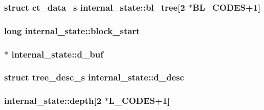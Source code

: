 \subsubsection[{bl\+\_\+tree}]{\setlength{\rightskip}{0pt plus 5cm}struct {\bf ct\+\_\+data\+\_\+s} internal\+\_\+state\+::bl\+\_\+tree\mbox{[}2 $\ast${\bf B\+L\+\_\+\+C\+O\+D\+E\+S}+1\mbox{]}}\label{structinternal__state_a98131fc5b64d0d7542bc3621aef19854}
\hypertarget{structinternal__state_a4ba16849758dfa969066693ca2cae880}{}
\subsubsection[{block\+\_\+start}]{\setlength{\rightskip}{0pt plus 5cm}long internal\+\_\+state\+::block\+\_\+start}\label{structinternal__state_a4ba16849758dfa969066693ca2cae880}
\hypertarget{structinternal__state_ac636c34c1c08dc9d2f9c199ce2caa99d}{}
\subsubsection[{d\+\_\+buf}]{$\ast$ internal\+\_\+state\+::d\+\_\+buf}\label{structinternal__state_ac636c34c1c08dc9d2f9c199ce2caa99d}
\hypertarget{structinternal__state_ab2fddb383d3055b6ec81c7fef14e99d8}{}
\subsubsection[{d\+\_\+desc}]{\setlength{\rightskip}{0pt plus 5cm}struct {\bf tree\+\_\+desc\+\_\+s} internal\+\_\+state\+::d\+\_\+desc}\label{structinternal__state_ab2fddb383d3055b6ec81c7fef14e99d8}
\hypertarget{structinternal__state_a8e525b4f3dfa38b3bbcb8b427e333570}{}
\subsubsection[{depth}]{ internal\+\_\+state\+::depth\mbox{[}2 $\ast${\bf L\+\_\+\+C\+O\+D\+E\+S}+1\mbox{]}}\label{structinternal__state_a8e525b4f3dfa38b3bbcb8b427e333570}
\hypertarget{structinternal__state_ab000a3e3c901dd063859521988ad7e52}{}
